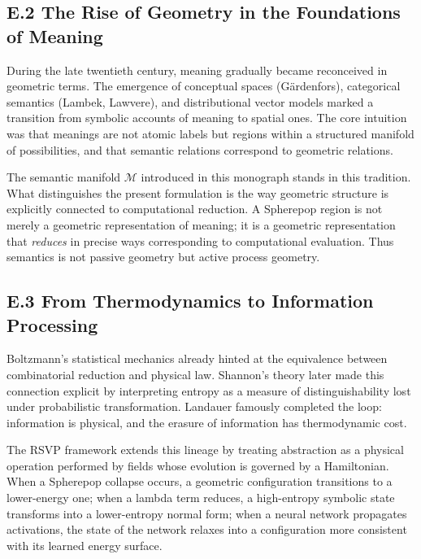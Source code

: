 \documentclass[12pt,letterpaper]{article}
\begin{document}
\subsection*{E.2 The Rise of Geometry in the Foundations of Meaning}

During the late twentieth century, meaning gradually became reconceived in 
geometric terms.  The emergence of conceptual spaces (Gärdenfors), categorical 
semantics (Lambek, Lawvere), and distributional vector models marked a transition 
from symbolic accounts of meaning to spatial ones.  The core intuition was that 
meanings are not atomic labels but regions within a structured manifold of 
possibilities, and that semantic relations correspond to geometric relations.

The semantic manifold $\mathcal{M}$ introduced in this monograph stands in this 
tradition.  What distinguishes the present formulation is the way geometric 
structure is explicitly connected to computational reduction.  A Spherepop region 
is not merely a geometric representation of meaning; it is a geometric 
representation that \emph{reduces} in precise ways corresponding to computational 
evaluation.  Thus semantics is not passive geometry but active process geometry.

\subsection*{E.3 From Thermodynamics to Information Processing}

Boltzmann’s statistical mechanics already hinted at the equivalence between 
combinatorial reduction and physical law.  Shannon’s theory later made this 
connection explicit by interpreting entropy as a measure of distinguishability 
lost under probabilistic transformation.  Landauer famously completed the loop: 
information is physical, and the erasure of information has thermodynamic cost.

The RSVP framework extends this lineage by treating abstraction as a physical 
operation performed by fields whose evolution is governed by a Hamiltonian.  
When a Spherepop collapse occurs, a geometric configuration transitions to a 
lower-energy one; when a lambda term reduces, a high-entropy symbolic state 
transforms into a lower-entropy normal form; when a neural network propagates 
activations, the state of the network relaxes into a configuration more 
consistent with its learned energy surface.
\end{document}

